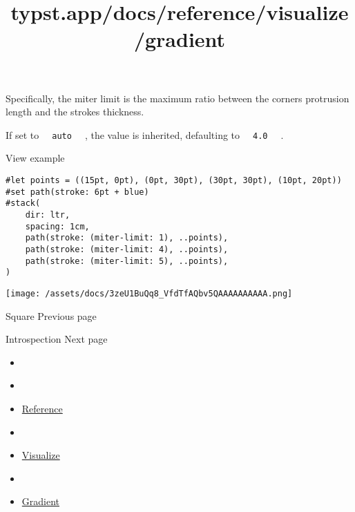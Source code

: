 Specifically, the miter limit is the maximum ratio between the
corner\textquotesingle s protrusion length and the
stroke\textquotesingle s thickness.

If set to \texttt{\ }{\texttt{\ auto\ }}\texttt{\ } , the value is
inherited, defaulting to \texttt{\ }{\texttt{\ 4.0\ }}\texttt{\ } .


View example

\begin{verbatim}
#let points = ((15pt, 0pt), (0pt, 30pt), (30pt, 30pt), (10pt, 20pt))
#set path(stroke: 6pt + blue)
#stack(
    dir: ltr,
    spacing: 1cm,
    path(stroke: (miter-limit: 1), ..points),
    path(stroke: (miter-limit: 4), ..points),
    path(stroke: (miter-limit: 5), ..points),
)
\end{verbatim}

\texttt{[image: /assets/docs/3zeU1BuQq8\_VfdTfAQbv5QAAAAAAAAAA.png]}

\href{/docs/reference/visualize/square/}{\pandocbounded{}}

{ Square } { Previous page }

\href{/docs/reference/introspection/}{\pandocbounded{}}

{ Introspection } { Next page }


\title{typst.app/docs/reference/visualize/gradient}

\begin{itemize}
\tightlist
\item
  \href{/docs}{}
\item
  
\item
  \href{/docs/reference/}{Reference}
\item
  
\item
  \href{/docs/reference/visualize/}{Visualize}
\item
  
\item
  \href{/docs/reference/visualize/gradient/}{Gradient}
\end{itemize}

